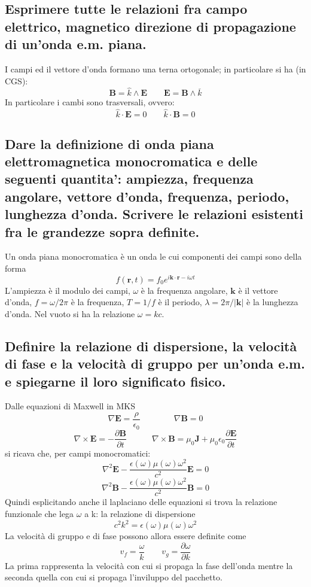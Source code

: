 \subsection[$\ $ Relazioni tra campo elettrico e magnetico]{Esprimere tutte le relazioni fra campo elettrico, magnetico direzione di propagazione di un’onda e.m. piana.}
I campi ed il vettore d'onda formano una terna ortogonale; in particolare si ha (in CGS):
\[
	\boldsymbol{B} = \hat{k} \wedge \boldsymbol{E} \quad \quad 
	\boldsymbol{E} = \boldsymbol{B} \wedge \overline{k} 
\] 
In particolare i cambi sono trasversali, ovvero:
\[
	\hat{k} \cdot \boldsymbol{E} = 0 \quad \quad 
	\hat{k} \cdot \boldsymbol{B} = 0
\] 

\subsection[$\ $ Onda piana elettromagnetica: ampiezza, frequenza, vettore d'onda, lunghezza d'onda]{Dare la definizione di onda piana elettromagnetica monocromatica e delle seguenti quantita’: ampiezza, frequenza angolare, vettore d’onda, frequenza, periodo, lunghezza
d’onda. Scrivere le relazioni esistenti fra le grandezze sopra definite.}
Un onda piana monocromatica è un onda le cui componenti dei campi sono della forma 
\[
	f\left( \boldsymbol{r}, t \right) = f_{0} e^{i \boldsymbol{k} \cdot \boldsymbol{r} - i \omega t }
\] 
L'ampiezza è il modulo dei campi, $\omega$ è la frequenza angolare, $\boldsymbol{k}$ è il vettore d'onda, $f = \omega/2\pi$ è la frequenza, $T = 1/f$ è il periodo, $\lambda = 2\pi/\boldsymbol{|k|}$ è la lunghezza d'onda. Nel vuoto si ha la relazione $\omega = k c$.

\subsection[$\ $ Relazione di dispersione, velocità di fase e di gruppo]{Definire la relazione di dispersione, la velocità di fase e la velocità di gruppo per un’onda e.m. e spiegarne il loro significato fisico. }
Dalle equazioni di Maxwell in MKS
\[
	\nabla \boldsymbol{E} = \frac{\rho}{\epsilon_0} \quad \quad \quad \quad 
	\nabla \boldsymbol{B} = 0 
\] 
\[
	\nabla \times \boldsymbol{E} = - \frac{\partial \boldsymbol{B} }{\partial t} \quad \quad \quad
	\nabla \times \boldsymbol{B} = \mu_0 \boldsymbol{J} + \mu_0 \epsilon_0 \frac{\partial \boldsymbol{E} }{\partial t} 
\] 
si ricava che, per campi monocromatici:	
\[
	\nabla^{2}\boldsymbol{E} - \frac{\epsilon\left( \omega \right) \mu \left( \omega \right) \omega^{2}}{c^{2}}\boldsymbol{E} = 0 
\]
\[
	\nabla^{2}\boldsymbol{B} - \frac{\epsilon\left( \omega \right) \mu \left( \omega \right) \omega^{2}}{c^{2}}\boldsymbol{B} = 0
\] 
Quindi esplicitando anche il laplaciano delle equazioni si trova la relazione funzionale che lega $\omega$ a k: la relazione di dispersione
\[
	c^{2}k^{2} = \epsilon \left( \omega \right) \mu \left( \omega \right) \omega^{2}
\] 
La velocità di gruppo e di fase possono allora essere definite come
\[
v_{f} = \frac{\omega}{k} \quad \quad 
v_{g} = \frac{\partial \omega}{\partial k} 
\]
La prima rappresenta la velocità con cui si propaga la fase dell'onda mentre la seconda quella con cui si propaga l'inviluppo del pacchetto. 
